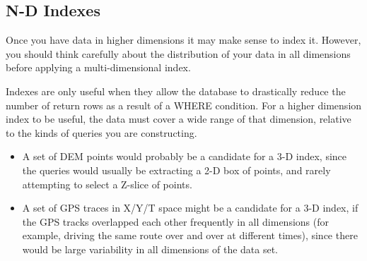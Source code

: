 \documentclass[a4paper,11pt,english]{sphinxmanual}
\begin{document}
\begin{sphinxVerbatim}[commandchars=\\\{\}]
 

 

\end{sphinxVerbatim}


\subsection{N-D Indexes}
\label{\detokenize{advanced:n-d-indexes}}
Once you have data in higher dimensions it may make sense to index it. However, you should think carefully about the distribution of your data in all dimensions before applying a multi-dimensional index.

Indexes are only useful when they allow the database to drastically reduce the number of return rows as a result of a WHERE condition. For a higher dimension index to be useful, the data must cover a wide range of that dimension, relative to the kinds of queries you are constructing.
\begin{itemize}
\item {} 
A set of DEM points would probably be a  candidate for a 3-D index, since the queries would usually be extracting a 2-D box of points, and rarely attempting to select a Z-slice of points.

\item {} 
A set of GPS traces in X/Y/T space might be a  candidate for a 3-D index, if the GPS tracks overlapped each other frequently in all dimensions (for example, driving the same route over and over at different times), since there would be large variability in all dimensions of the data set.

\end{itemize}
\end{document}
